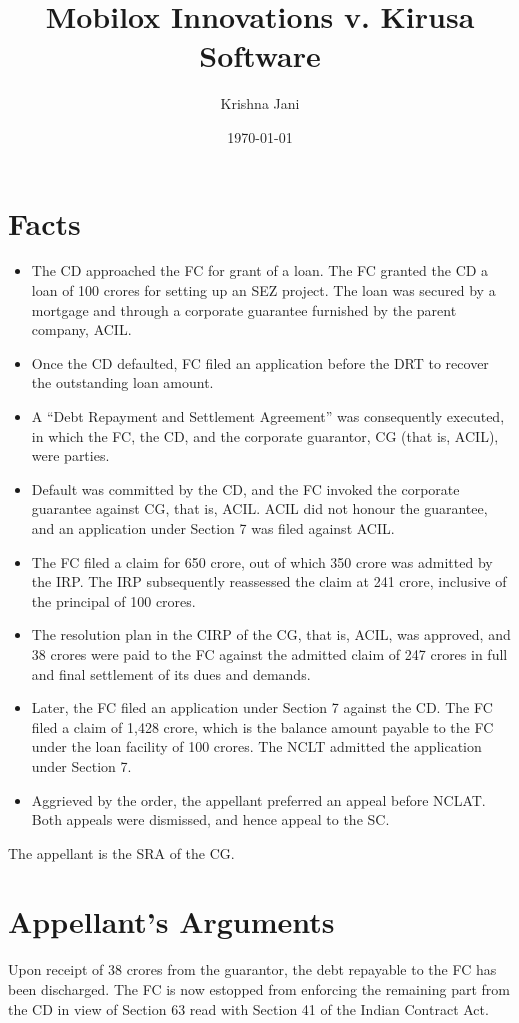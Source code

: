 \documentclass[12pt]{article}
\author{Krishna Jani}
\date{\today}
\title{Mobilox Innovations v. Kirusa Software}
\begin{document}
\maketitle

\section*{Facts}

\begin{itemize}
\item The CD approached the FC for grant of a loan. The FC granted the CD a loan of 100 crores for setting up an SEZ project. The loan was secured by a mortgage and through a corporate guarantee furnished by the parent company, ACIL.
\item Once the CD defaulted, FC filed an application before the DRT to recover the outstanding loan amount.
\item A ``Debt Repayment and Settlement Agreement'' was consequently executed, in which the FC, the CD, and the corporate guarantor, CG (that is, ACIL), were parties.
\item Default was committed by the CD, and the FC invoked the corporate guarantee against CG, that is, ACIL. ACIL did not honour the guarantee, and an application under Section 7 was filed against ACIL.
\item The FC filed a claim for 650 crore, out of which 350 crore was admitted by the IRP. The IRP subsequently reassessed the claim at 241 crore, inclusive of the principal of 100 crores.
\item The resolution plan in the CIRP of the CG, that is, ACIL, was approved, and 38 crores were paid to the FC against the admitted claim of 247 crores in full and final settlement of its dues and demands.
\item Later, the FC filed an application under Section 7 against the CD. The FC filed a claim of 1,428 crore, which is the balance amount payable to the FC under the loan facility of 100 crores. The NCLT admitted the application under Section 7.
\item Aggrieved by the order, the appellant preferred an appeal before NCLAT. Both appeals were dismissed, and hence appeal to the SC.
\end{itemize}

The appellant is the SRA of the CG.

\section*{Appellant's Arguments}

Upon receipt of 38 crores from the guarantor, the debt repayable to the FC has been discharged. The FC is now estopped from enforcing the remaining part from the CD in view of Section 63 read with Section 41 of the Indian Contract Act.
\end{document}
